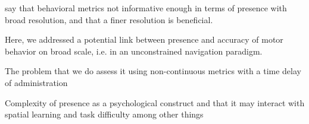 say that behavioral metrics not informative enough in terms of presence with broad resolution, and that a finer resolution is beneficial.

Here, we addressed a potential link between presence and accuracy of motor behavior on broad scale, i.e. in an unconstrained navigation paradigm. 

The problem that we do assess it using non-continuous metrics with a time delay of administration~\cite{Gehrke:2019:DVM:3290605.3300657}

Complexity of presence as a psychological construct and that it may interact with spatial learning and task difficulty among other things~\cite{} %